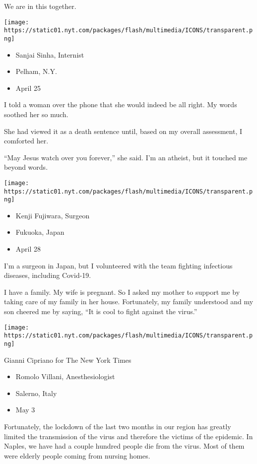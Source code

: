 We are in this together.

\texttt{[image: https://static01.nyt.com/packages/flash/multimedia/ICONS/transparent.png]}

\begin{itemize}
\tightlist
\item
  Sanjai Sinha, Internist
\item
  Pelham, N.Y.
\item
  April 25
\end{itemize}

I told a woman over the phone that she would indeed be all right. My
words soothed her so much.

She had viewed it as a death sentence until, based on my overall
assessment, I comforted her.

``May Jesus watch over you forever,'' she said. I'm an atheist, but it
touched me beyond words.

\texttt{[image: https://static01.nyt.com/packages/flash/multimedia/ICONS/transparent.png]}

\begin{itemize}
\tightlist
\item
  Kenji Fujiwara, Surgeon
\item
  Fukuoka, Japan
\item
  April 28
\end{itemize}

I'm a surgeon in Japan, but I volunteered with the team fighting
infectious diseases, including Covid-19.

I have a family. My wife is pregnant. So I asked my mother to support me
by taking care of my family in her house. Fortunately, my family
understood and my son cheered me by saying, ``It is cool to fight
against the virus.''

\texttt{[image: https://static01.nyt.com/packages/flash/multimedia/ICONS/transparent.png]}

Gianni Cipriano for The New York Times

\begin{itemize}
\tightlist
\item
  Romolo Villani, Anesthesiologist
\item
  Salerno, Italy
\item
  May 3
\end{itemize}

Fortunately, the lockdown of the last two months in our region has
greatly limited the transmission of the virus and therefore the victims
of the epidemic. In Naples, we have had a couple hundred people die from
the virus. Most of them were elderly people coming from nursing homes.

